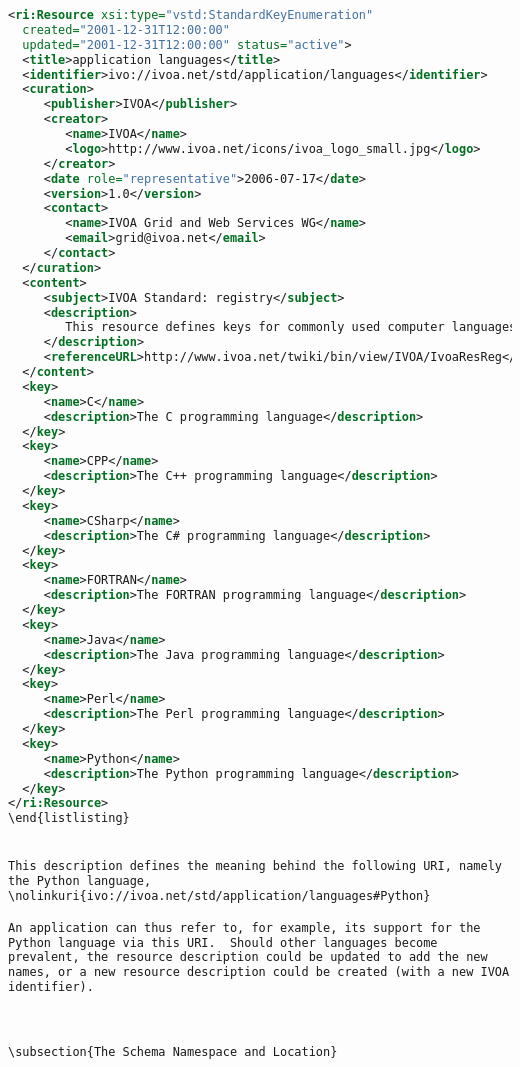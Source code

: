 \documentclass[11pt,a4paper]{ivoa}
\begin{document}
\begin{lstlisting}[language=xml]
<ri:Resource xsi:type="vstd:StandardKeyEnumeration" 
  created="2001-12-31T12:00:00"
  updated="2001-12-31T12:00:00" status="active">
  <title>application languages</title>
  <identifier>ivo://ivoa.net/std/application/languages</identifier>
  <curation>
     <publisher>IVOA</publisher>
     <creator>
        <name>IVOA</name>
        <logo>http://www.ivoa.net/icons/ivoa_logo_small.jpg</logo>
     </creator>
     <date role="representative">2006-07-17</date>
     <version>1.0</version>
     <contact>
        <name>IVOA Grid and Web Services WG</name>
        <email>grid@ivoa.net</email>
     </contact>
  </curation>
  <content>
     <subject>IVOA Standard: registry</subject>
     <description>
        This resource defines keys for commonly used computer languages.
     </description>
     <referenceURL>http://www.ivoa.net/twiki/bin/view/IVOA/IvoaResReg</referenceURL>
  </content>
  <key>
     <name>C</name>
     <description>The C programming language</description>
  </key>
  <key>
     <name>CPP</name>
     <description>The C++ programming language</description>
  </key>
  <key>
     <name>CSharp</name>
     <description>The C# programming language</description>
  </key>
  <key>
     <name>FORTRAN</name>
     <description>The FORTRAN programming language</description>
  </key>
  <key>
     <name>Java</name>
     <description>The Java programming language</description>
  </key>
  <key>
     <name>Perl</name>
     <description>The Perl programming language</description>
  </key>
  <key>
     <name>Python</name>
     <description>The Python programming language</description>
  </key>
</ri:Resource>
\end{listlisting}


This description defines the meaning behind the following URI, namely
the Python language,
\nolinkuri{ivo://ivoa.net/std/application/languages#Python}

An application can thus refer to, for example, its support for the
Python language via this URI.  Should other languages become
prevalent, the resource description could be updated to add the new
names, or a new resource description could be created (with a new IVOA
identifier). 



\subsection{The Schema Namespace and Location}


\end{lstlisting}
\end{document}
